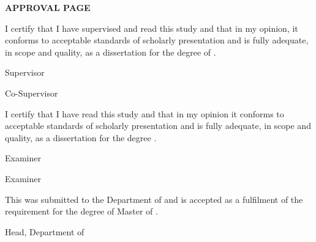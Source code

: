 \documentclass[12pt, a4paper, oneside]{memoir}
\begin{document}
\pagestyle{empty}

\begin{center}
\fontsize{14bp}{16bp}
\textbf{\MakeUppercase{Approval Page}}
\end{center}

\vspace{24pt}

\fontsize{12bp}{14bp}
\noindent I certify that I have supervised and read this study and that in my opinion, it 
conforms to acceptable standards of scholarly presentation and is fully 
adequate, in scope and quality, as a dissertation for the degree of \myDegree.
\\[18pt]

\hfill \makebox[2in]{\dotfill}

\hfill \mySupervisor

\hfill Supervisor\\[6pt]

\ifdefined\myCoSupervisor
  \hfill \makebox[2in]{\dotfill}

  \hfill \myCoSupervisor

  \hfill Co-Supervisor\\[18pt]
\fi

\ifdefined\myExaminerOne
  \noindent I certify that I have read this study and that in my opinion it 
  conforms to acceptable standards of scholarly presentation and is fully 
  adequate, in scope and quality, as a dissertation for the degree 
  \myDegree.\\[18pt]

  \hfill \makebox[2in]{\dotfill}

  \hfill \myExaminerOne

  \hfill Examiner\\[18pt]

  \ifdefined\myExaminerTwo

    \hfill \makebox[2in]{\dotfill}

    \hfill \myExaminerTwo

    \hfill Examiner\\[6pt]
  \fi
\fi

\ifdefined\myDepartmentHead
  \noindent This \myDocument was submitted to the Department of \myDepartment and is accepted as a fulfilment of the requirement for the degree of Master of \mySubject.\\[18pt]

  \hfill \makebox[2in]{\dotfill}

  \hfill \myDepartmentHead

  \hfill Head, Department of \myDepartment\\[6pt]
\fi
\end{document}
